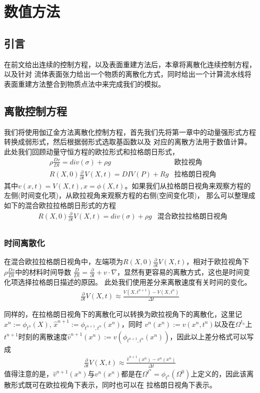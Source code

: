 \chapter{数值方法} \label{chap4}
\section{引言}
在前文给出连续的控制方程，以及表面重建方法后，本章将离散化连续控制方程，以及针对
流体表面张力给出一个物质的离散化方式，同时给出一个计算流水线将表面重建方法整合到物质点法中来完成我们的模拟。
\section{离散控制方程}
我们将使用伽辽金方法离散化控制方程，首先我们先将第一章中的动量强形式方程转换成弱形式，然后根据弱形式选取基函数以及
对应的离散方法用于数值计算。此处我们回顾动量守恒方程的欧拉形式和拉格朗日形式，
\begin{align*}    
    &\rho \frac{Dv}{Dt} = div(\sigma) + \rho g & \text{欧拉视角}\\
    &R(X,0)\frac{\partial}{\partial t} V(X,t) = DIV(P) + Rg &\text{拉格朗日视角}
\end{align*}
其中$v(x,t) = V(X,t), x = \phi(X,t)$。如果我们从拉格朗日视角来观察方程的左侧(时间变化项)，从欧拉视角来观察方程的右侧(空间变化项)，
那么可以整理成如下的混合欧拉拉格朗日形式的方程
\begin{align*}
    &R(X,0)\frac{\partial}{\partial t} V(X,t) = div(\sigma) + \rho g & \text{混合欧拉拉格朗日视角}\\ 
\end{align*}
\subsection{时间离散化}
在混合欧拉拉格朗日视角中，左端项为$R(X,0)\frac{\partial}{\partial t}V(X,t)$，相对于欧拉视角下$\rho \frac{Dv}{Dt}$中的材料时间导数
$\frac{D}{Dt} = \frac{\partial}{\partial t} + v\cdot \nabla$，显然有更容易的离散方式，这也是时间变化项选择拉格朗日描述的原因。
此处我们使用差分来离散速度有关时间的变化。
\begin{align*}
    \frac{\partial}{\partial t} V(X,t) \approx \frac{V(X,t^{n+1}) - V(X,t^n)}{\Delta t}
\end{align*}

同样的，在拉格朗日视角下的离散化可以转换为欧拉视角下的离散化，这里记$x^{n} := \phi_{t^n}(X)$, $\hat{x}^{n+1} := \phi_{t^{n+1},t^n}(x^n)$，同时
$v^n(x^n) := v(x^n,t^n)$以及在$\Omega^{t_n}$上$t^{n+1}$时刻的离散速度$\hat{v}^{n+1}(x^n) := v(\phi_{t^{n+1},t^n}(x^n))$，因此以上差分格式可以写成
\begin{align*}
    \frac{\partial}{\partial t} V(X,t) \approx \frac{\hat{v}^{n+1}(x^n) - v^n(x^n)}{\Delta t}
\end{align*}
值得注意的是，$\hat{v}^{n+1}(x^n)$与$v^n(x^n)$都是在$\Omega^{t^n} = \phi_{t^n}(\Omega^0)$上定义的，因此该离散形式既可在欧拉视角下表示，同时也可以在
拉格朗日视角下表示。
